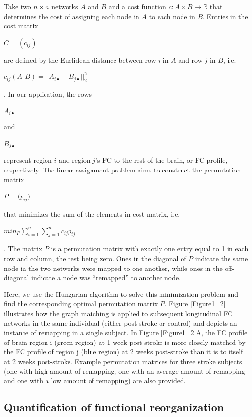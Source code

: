 \documentclass[phd,tocprelim]{cornell}
\begin{document}
	Take two $n \times n $ networks $A$ and $B$ and a cost function $c: A \times B \rightarrow  \mathbb{R}$  that determines the cost of assigning each node in $A$ to each node in $B$. Entries in the cost matrix 
	\begin{Large}
	$C = (c_{i j})$
	\end{Large}
	 are defined by the Euclidean distance between row $i$ in $A$ and row $j$ in $B$, i.e. \begin{Large}$c_{ij}(A,B)=|| A_{i\bullet}-B_{j \bullet} ||^2_2$\end{Large}. In our application, the rows \begin{Large}$A_{i\bullet}$\end{Large} and \begin{Large}$B_{j \bullet}$\end{Large} represent region $i$ and region $j$'s FC to the rest of the brain, or FC profile, respectively. The linear assignment problem aims to construct the permutation matrix \begin{Large}$P = \big(p_{i j}\big)$\end{Large} that minimizes the sum of the elements in cost matrix, i.e. \begin{Large}$min_P\sum^n_{i=1}\sum^n_{j=1}c_{ij}p_{ij}$\end{Large} . The matrix $P$ is a permutation matrix with exactly one entry equal to 1 in each row and column, the rest being zero. Ones in the diagonal of $P$ indicate the same node in the two networks were mapped to one another, while ones in the off-diagonal indicate a node was “remapped” to another node.
	
	Here, we use the Hungarian algorithm to solve this minimization problem and find the corresponding optimal permutation matrix $P$. Figure \ref{Figure1_2} illustrates how the graph matching is applied to subsequent longitudinal FC networks in the same individual (either post-stroke or control) and depicts an instance of remapping in a single subject.  In Figure \ref{Figure1_2}A, the FC profile of brain region i (green region) at 1 week post-stroke is more closely matched by the FC profile of region j (blue region) at 2 weeks post-stroke than it is to itself at 2 weeks post-stroke. Example permutation matrices for three stroke subjects (one with high amount of remapping, one with an average amount of remapping and one with a low amount of remapping) are also provided. 
	
	\subsection{Quantification of functional reorganization}
	
\end{document}
